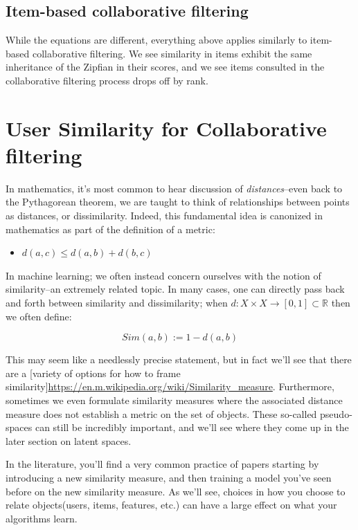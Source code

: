 \subsection{Item-based collaborative filtering}

While the equations are different, everything above applies similarly to item-based collaborative filtering. We see similarity in items exhibit the same inheritance of the Zipfian in their scores, and we see items consulted in the collaborative filtering process drops off by rank. 

\section{User Similarity for Collaborative filtering}

In mathematics, it's most common to hear discussion of \emph{distances}–even back to the Pythagorean theorem, we are taught to think of relationships between points as distances, or dissimilarity. Indeed, this fundamental idea is canonized in mathematics as part of the definition of a metric:
\begin{itemize}
    \item $d(a,c)\leq d(a,b)+d(b,c)$
\end{itemize}


In machine learning; we often instead concern ourselves with the notion of similarity–an extremely related topic. In many cases, one can directly pass back and forth between similarity and dissimilarity; when $d:X\times X\rightarrow [0,1]\subset\mathbb{R}$ then we often define:

\begin{equation}
    Sim(a,b):=1-d(a,b)
\end{equation}

This may seem like a needlessly precise statement, but in fact we'll see that there are a [variety of options for how to frame similarity]\url{https://en.m.wikipedia.org/wiki/Similarity_measure}. Furthermore, sometimes we even formulate similarity measures where the associated distance measure does not establish a metric on the set of objects. These so-called pseudo-spaces can still be incredibly important, and we'll see where they come up in the later section on latent spaces. 

In the literature, you'll find a very common practice of papers starting by introducing a new similarity measure, and then training a model you've seen before on the new similarity measure. As we'll see, choices in how you choose to relate objects(users, items, features, etc.) can have a large effect on what your algorithms learn. 

